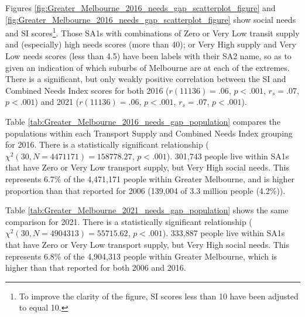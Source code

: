 \documentclass[preprint, 3p,
authoryear]{elsarticle} %
\begin{document}
Figures \ref{fig:Greater_Melbourne_2016_needs_gap_scatterplot_figure}
and \ref{fig:Greater_Melbourne_2016_needs_gap_scatterplot_figure} show
social needs and SI scores\footnote{To improve the clarity of the
  figure, SI scores less than 10 have been adjusted to equal 10.}. Those
SA1s with combinations of Zero or Very Low transit supply and
(especially) high needs scores (more than 40); or Very High supply and
Very Low needs scores (less than 4.5) have been labels with their SA2
name, so as to given an indication of which suburbs of Melbourne are at
each of the extremes. There is a significant, but only weakly positive
correlation between the SI and Combined Needs Index scores for both 2016
(\(r(11136) = .06\), \(p < .001\), \(r_s =.07\), \(p < .001\)) and 2021
(\(r(11136) = .06\), \(p < .001\), \(r_s =.07\), \(p < .001\)).

Table \ref{tab:Greater_Melbourne_2016_needs_gap_population} compares the
populations within each Transport Supply and Combined Needs Index
grouping for 2016. There is a statistically significant relationship
(\(\chi^2(30, N = 4471171) = 158778.27\), \(p < .001\)). 301,743 people
live within SA1s that have Zero or Very Low transport supply, but Very
High social needs. This represents 6.7\% of the 4,471,171 people within
Greater Melbourne, and is higher proportion than that reported for 2006
(139,004 of 3.3 million people (4.2\%)).

Table \ref{tab:Greater_Melbourne_2021_needs_gap_population} shows the
same comparison for 2021. There is a statistically significant
relationship (\(\chi^2(30, N = 4904313) = 55715.62\), \(p < .001\)).
333,887 people live within SA1s that have Zero or Very Low transport
supply, but Very High social needs. This represents 6.8\% of the
4,904,313 people within Greater Melbourne, which is higher than that
reported for both 2006 and 2016.

\begingroup\fontsize{8}{10}\selectfont
\end{document}
